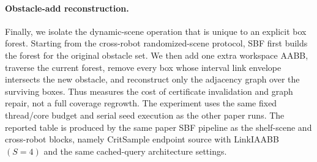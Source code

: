 \documentclass[journal]{IEEEtran}
\begin{document}
\paragraph{Obstacle-add reconstruction.}
Finally, we isolate the dynamic-scene operation that is unique to an explicit
box forest. Starting from the cross-robot randomized-scene protocol, SBF first builds
the forest for the original obstacle set. We then add one extra workspace AABB,
traverse the current forest, remove every box whose interval link envelope
intersects the new obstacle, and reconstruct only the adjacency graph over the
surviving boxes. Thus  measures the cost of certificate
invalidation and graph repair, not a full coverage regrowth. The experiment
uses the same fixed thread/core budget and serial seed execution as the other
paper runs. The reported table is produced by the same paper SBF pipeline as the
shelf-scene and cross-robot blocks, namely CritSample endpoint source with
LinkIAABB$(S=4)$ and the same cached-query architecture settings.







\end{document}
